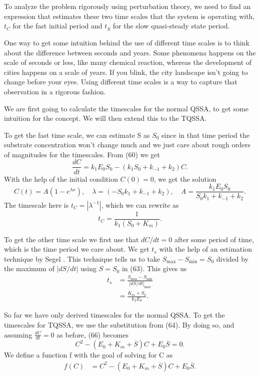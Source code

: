 \documentclass[12pt]{article}
\begin{document}
To analyze the problem rigorously using perturbation theory, we need
to find an expression that estimates these two time scales that the
system is operating with, $t_C$ for the fast initial period and
$t_{\overline{S}}$ for the slow quasi-steady state period.

One way to get some intuition behind the use of different time scales
is to think about the difference between seconds and years. Some
phenomena happens on the scale of seconds or less, like many chemical
reaction, whereas the development of cities happens on a scale of
years. If you blink, the city landscape isn't going to change before
your eyes. Using different time scales is a way to capture that
observation in a rigorous fashion.

We are first going to calculate the timescales for the normal QSSA, to
get some intuition for the concept. We will then extend this to the
TQSSA.

To get the fast time scale, we can estimate S as $S_0$ since in that
time period the substrate concentration won't change much and we just
care about rough orders of magnitudes for the timescales. From (60) we
get
\begin{equation}
  \frac{dC}{dt} = k_1E_0 S_0 - (k_1 S_0 + k_{-1} + k_2)C.
\end{equation}
With the help of the initial condition $C(0)=0$, we get the solution
\begin{equation}
  C(t) = A(1 -  e^{\lambda x}), \quad
  \lambda = (-S_0 k_1 + k_{-1} + k_2), \quad
  A =\frac{k_1 E_0 S_0}{S_0 k_1 + k_{-1} + k_2}.
\end{equation}
The timescale here is $t_C = |\lambda^{-1}|$, which we can rewrite as
\begin{equation}
  t_C = \frac{1}{k_1(S_0+K_m)}.
\end{equation}

To get the other time scale we first use that $dC/dt = 0$ after some
period of time, which is the time period we care about. We get $t_s$
with the help of an estimation technique by Segel
\cite{segel1984modeling}. This technique tells us to take
$S_{\max} - S_{\min} = S_0$ divided by the maximum of $|dS/dt|$ using
$S=S_0$ in (63). This gives us
\begin{align}
  t_s &= \frac{S_{\max} - S_{\min}}{|dS/dt|_{\max}} \\
      &= \frac{K_m + S_0}{k_2 E_0}.
\end{align}

So far we have only derived timescales for the normal QSSA. To get the
timescales for TQSSA, we use the substitution from (64). By doing so,
and assuming $\frac{dC}{dt}=0$ as before, (66) becomes
\begin{equation}
  C^2 - (E_0 + K_m + \overline{S})C + E_0 \overline{S} = 0.
\end{equation}
We define a function f with the goal of solving for C as
\begin{align}
  f(C) &= C^2 - (E_0 + K_m + \overline{S})C + E_0 \overline{S}.
\end{align}
\end{document}
